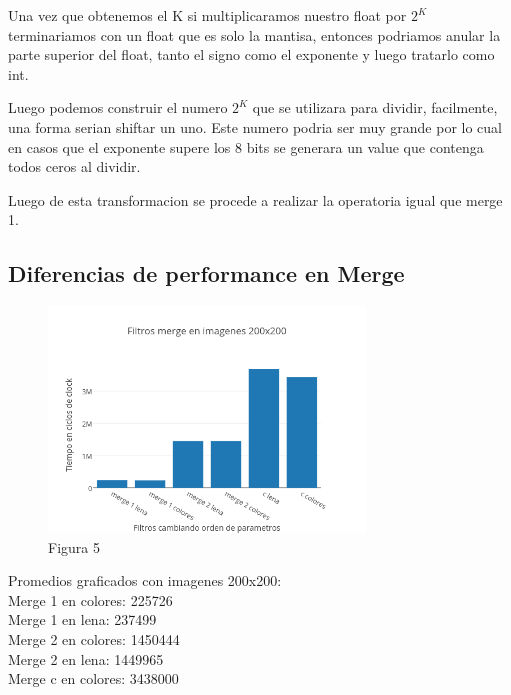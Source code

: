 \documentclass[a4paper]{article}
\begin{document}
Una vez que obtenemos el K si multiplicaramos nuestro float por $2^K$ terminariamos con un float que es solo la mantisa, entonces podriamos anular la parte superior del float, tanto el signo como el exponente y luego tratarlo como int.

Luego podemos construir el numero $2^K$ que se utilizara para dividir, facilmente, una forma serian shiftar un uno. Este numero podria ser muy grande por lo cual en casos que el exponente supere los 8 bits se generara un value que contenga todos ceros al dividir.

Luego de esta transformacion se procede a realizar la operatoria igual que merge 1.

\subsection{Diferencias de performance en Merge}

\begin{figure}[h]
  \centering
    \includegraphics[width=0.75\textwidth]{imagenes/FiltrosMergeEnImagenes200x200.png}
  \caption{Figura 5}
  \label{fig:graficomerge1}
\end{figure}
 \FloatBarrier

Promedios graficados con imagenes 200x200:
\\

Merge 1 en colores: 225726
\\

Merge 1 en lena: 237499
\\

Merge 2 en colores: 1450444
\\

Merge 2 en lena: 1449965
\\

Merge c en colores: 3438000
\\
 
\end{document}

